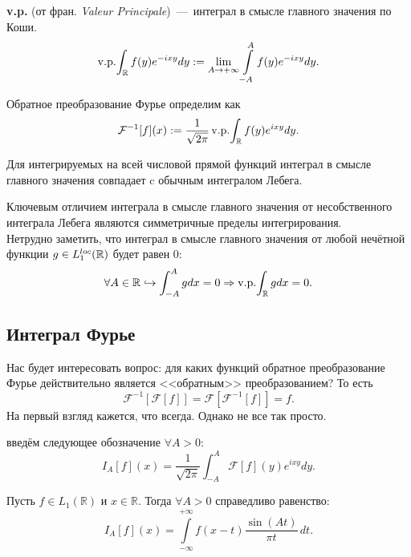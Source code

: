 \begin{note}
\textbf{v.p.} (от фран. \textit{Valeur Principale})~---~интеграл в смысле главного значения по Коши.
\[
\mathop{\mathrm{v.p.}}\!\int_{\mathbb{R}} f(y) e^{-ixy}dy := \lim_{A \to +\infty} \int\limits_{-A}^{A} f(y)e^{-ixy}dy.
\]
\end{note}

\begin{definition}
    Обратное преобразование Фурье определим как
    \[
        \mathcal{F}^{-1}[f](x) := \dfrac{1}{\sqrt {2\pi}}\mathop{\mathrm{v.p.}}\!\int_{\mathbb{R}} f(y)e^{ixy}dy.
    \]
\end{definition}

\begin{note}
    Для интегрируемых на всей числовой прямой функций интеграл в смысле главного значения совпадает c обычным интегралом Лебега.
\end{note}

\begin{note}
    Ключевым отличием интеграла в смысле главного значения от несобственного интеграла Лебега являются симметричные пределы интегрирования.\\
    Нетрудно заметить, что интеграл в смысле главного значения от любой нечётной функции $g \in L_1^{loc}(\mathbb{R})$ будет равен $0$:
    \[
        \forall A \in \mathbb{R} \hookrightarrow \int_{-A}^{A} g dx = 0 \Rightarrow \mathop{\mathrm{v.p.}}\!\int_{\mathbb{R}} gdx = 0.
    \]
\end{note}
\subsection{Интеграл Фурье}
\begin{question}
Нас будет интересовать вопрос: для каких функций обратное преобразование Фурье действительно является <<обратным>> преобразованием? То есть
\[
    \mathcal{F}^{-1}[\mathcal{F}[f]] = \mathcal{F}[\mathcal{F}^{-1}[f]] = f.
\]
На первый взгляд кажется, что всегда.
Однако не все так просто.
\end{question}
\begin{definition}
    введём следующее обозначение $\forall A > 0$:
    \[
        I_A[f](x) = \dfrac{1}{\sqrt {2\pi}} \int_{-A}^{A} \mathcal{F}[f](y)e^{ixy}dy.
    \]
\end{definition}

\begin{lemma}[Ключевая]\label{lem:key}
Пусть $f \in L_1(\mathbb{R})$ и $x \in \mathbb{R}$. Тогда $\forall A > 0$ справедливо равенство:
\[
I_A \left[ f \right](x) = \int\limits_{-\infty}^{+\infty} f(x - t) \frac{\sin(At)}{\pi t} \, dt.
\]
\end{lemma}


